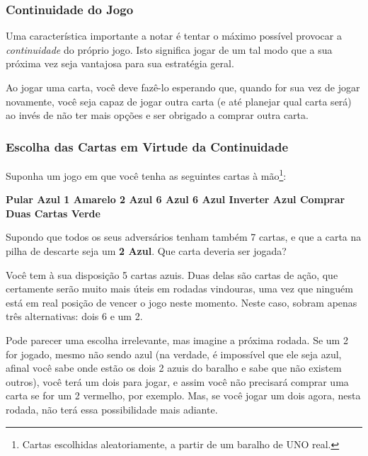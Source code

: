 \subsubsection{Continuidade do Jogo}

Uma característica importante a notar é tentar o máximo possível provocar a \textit{continuidade} do próprio jogo. Isto significa jogar de um tal modo que a sua próxima vez seja vantajosa para sua estratégia geral.

Ao jogar uma carta, você deve fazê-lo esperando que, quando for sua vez de jogar novamente, você seja capaz de jogar outra carta (e até planejar qual carta será) ao invés de não ter mais opções e ser obrigado a comprar outra carta.

\subsubsection{Escolha das Cartas em Virtude da Continuidade}

Suponha um jogo em que você tenha as seguintes cartas à mão\footnote{Cartas escolhidas aleatoriamente, a partir de um baralho de UNO real.}:

\vspace{0.5cm}

\textbf{Pular Azul \hspace{1cm} 1 Amarelo \hspace{1cm} 2 Azul \hspace{1cm} 6 Azul \hspace{1cm} 6 Azul \hspace{1cm} Inverter Azul \hspace{1cm} Comprar Duas Cartas Verde}

\vspace{0.5cm}

Supondo que todos os seus adversários tenham também 7 cartas, e que a carta na pilha de descarte seja um \textbf{2 Azul}. Que carta deveria ser jogada?

Você tem à sua disposição 5 cartas azuis. Duas delas são cartas de ação, que certamente serão muito mais úteis em rodadas vindouras, uma vez que ninguém está em real posição de vencer o jogo neste momento. Neste caso, sobram apenas três alternativas: dois 6 e um 2.

Pode parecer uma escolha irrelevante, mas imagine a próxima rodada. Se um 2 for jogado, mesmo não sendo azul (na verdade, é impossível que ele seja azul, afinal você sabe onde estão os dois 2 azuis do baralho e sabe que não existem outros), você terá um dois para jogar, e assim você não precisará comprar uma carta se for um 2 vermelho, por exemplo. Mas, se você jogar um dois agora, nesta rodada, não terá essa possibilidade mais adiante.

